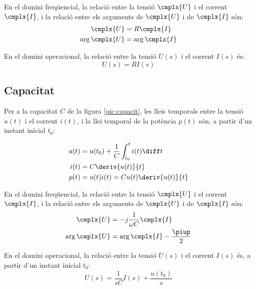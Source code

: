 En el domini freqüencial, la relació entre
la tensió $\cmplx{U}$ i el corrent $\cmplx{I}$, i la relació entre els arguments de $\cmplx{U}$ i de $\cmplx{I}$ són:
\begin{align}
	\cmplx{U} &= R \cmplx{I} \\ \arg{\cmplx{U}} &= \arg{\cmplx{I}}
\end{align}

 En el domini operacional, la relació entre la tensió $U(s)$ i el corrent $I(s)$ és:
\begin{equation}
	U(s) = R I(s)
\end{equation}

\subsection{Capacitat} 

Per a la capacitat $C$ de la figura
\vref{pic:capacit}, les lleis temporals entre la tensió $u(t)$ i el
corrent $i(t)$, i la llei temporal de la potència $p(t)$ són, a partir d'un instant inicial $t_0$:

\hfill
\begin{minipage}[b]{5cm}
	
	\label{pic:capacit}
\end{minipage}
\hfill
\begin{minipage}[b][3.8cm][t]{8cm}
	\begin{align}
		u(t) &= u(t_0) + \frac{1}{C} \int_{t_0}^t i(t) \diff t \\
		i(t) &= C \deriv{u(t)}{t} \\
		p(t) &= u(t) i(t) = C u(t) \deriv{u(t)}{t}
	\end{align}
\end{minipage}

En el domini freqüencial, la relació entre la tensió $\cmplx{U}$ i el corrent $\cmplx{I}$, i la relació entre els arguments de $\cmplx{U}$ i de $\cmplx{I}$  són:
\begin{align}
	\cmplx{U} &= -j \frac{1}{\omega C} \cmplx{I} \\
	\arg{\cmplx{U}} &= \arg{\cmplx{I}} - \frac{\piup}{2}
\end{align}

En el domini operacional, la relació entre la tensió $U(s)$ i el corrent $I(s)$ és, a partir d'un instant inicial $t_0$:
\begin{equation}
	U(s) = \frac{1}{s C} I(s) + \frac{u(t_0)}{s}
\end{equation}


